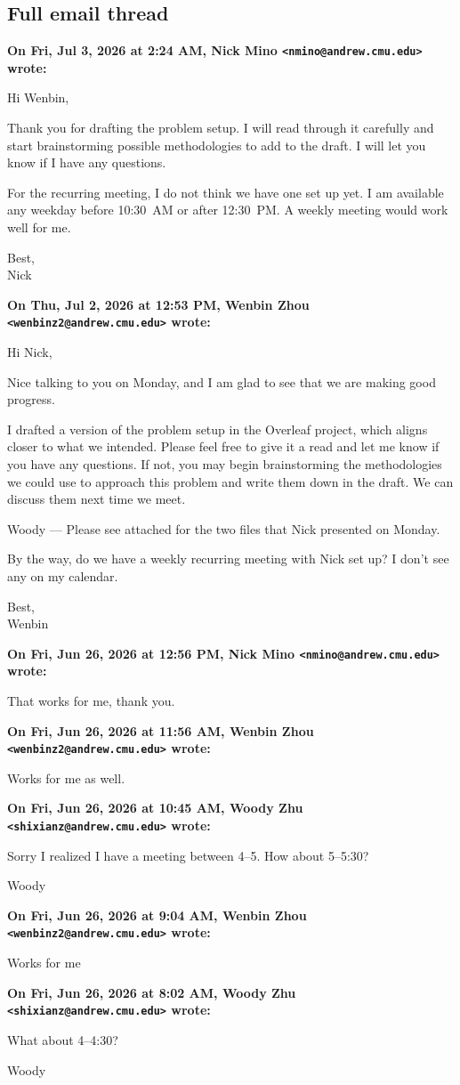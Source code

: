 \documentclass[11pt]{article}
\newcommand{\Email}[3]{%
  \medskip\noindent\textbf{On #1, #2 wrote:}\par\nobreak
  \begingroup\RaggedRight #3\par\endgroup
}
\begin{document}
\subsection*{Full email thread}
\Email{Fri, Jul 3, 2026 at 2:24 AM}{Nick Mino
\texttt{<nmino@andrew.cmu.edu>}}{%
Hi Wenbin,

Thank you for drafting the problem setup. I will read through it carefully and
start brainstorming possible methodologies to add to the draft. I will let you
know if I have any questions.

For the recurring meeting, I do not think we have one set up yet. I am
available any weekday before 10:30~AM or after 12:30~PM. A weekly meeting would
work well for me.

Best,\\
Nick}

\Email{Thu, Jul 2, 2026 at 12:53 PM}{Wenbin Zhou
\texttt{<wenbinz2@andrew.cmu.edu>}}{%
Hi Nick,

Nice talking to you on Monday, and I am glad to see that we are making good
progress.

I drafted a version of the problem setup in the Overleaf project, which aligns
closer to what we intended. Please feel free to give it a read and let me know
if you have any questions. If not, you may begin brainstorming the
methodologies we could use to approach this problem and write them down in the
draft. We can discuss them next time we meet.

Woody --- Please see attached for the two files that Nick presented on Monday.

By the way, do we have a weekly recurring meeting with Nick set up? I don't see
any on my calendar.

Best,\\
Wenbin}

\Email{Fri, Jun 26, 2026 at 12:56 PM}{Nick Mino
\texttt{<nmino@andrew.cmu.edu>}}{%
That works for me, thank you.}

\Email{Fri, Jun 26, 2026 at 11:56 AM}{Wenbin Zhou
\texttt{<wenbinz2@andrew.cmu.edu>}}{%
Works for me as well.}

\Email{Fri, Jun 26, 2026 at 10:45 AM}{Woody Zhu
\texttt{<shixianz@andrew.cmu.edu>}}{%
Sorry I realized I have a meeting between 4--5. How about 5--5:30?

Woody}

\Email{Fri, Jun 26, 2026 at 9:04 AM}{Wenbin Zhou
\texttt{<wenbinz2@andrew.cmu.edu>}}{%
Works for me}

\Email{Fri, Jun 26, 2026 at 8:02 AM}{Woody Zhu
\texttt{<shixianz@andrew.cmu.edu>}}{%
What about 4--4:30?

Woody}
\end{document}
